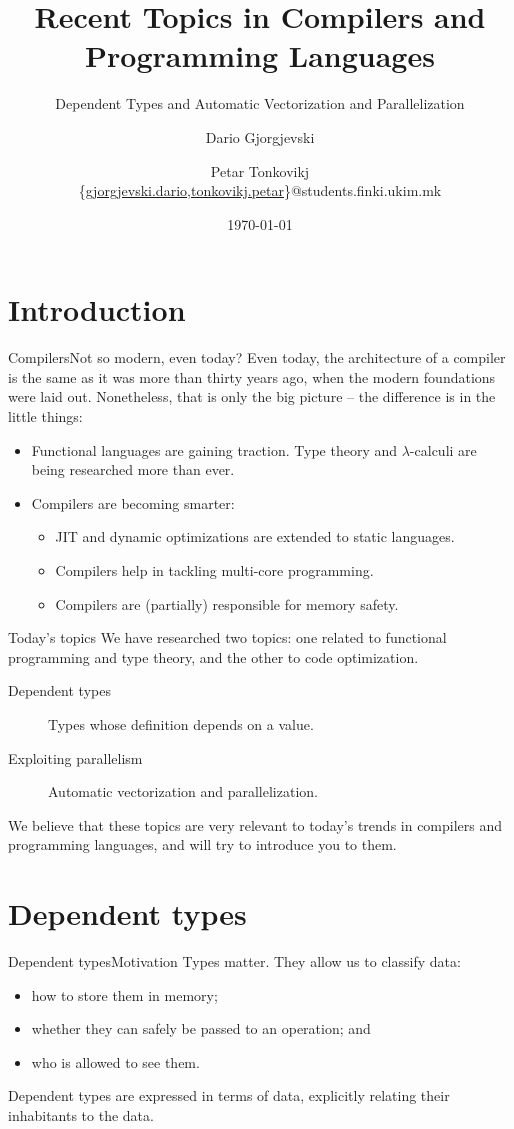 \documentclass[serif, xcolor={svgnames, table}, usepdftitle=false]{beamer}
\title[Recent Topics in Compilers]{Recent Topics in Compilers and Programming Languages}
\subtitle{Dependent Types and Automatic Vectorization and Parallelization}
\author[D.~Gj. and P.~T.]{%
  Dario Gjorgjevski\inst{1} \and Petar Tonkovikj\inst{1}\\%
  {\ttfamily\{\href{mailto:gjorgjevski.dario@students.finki.ukim.mk}{gjorgjevski.dario},\href{mailto:tonkovikj.petar@students.finki.ukim.mk}{tonkovikj.petar}\}@students.finki.ukim.mk}
}
\institute[FCSE]{%
  \inst{1}Faculty of Computer Science and Engineering\\%
  Ss.\ Cyril and Methodius University in Skopje
}
\date{\today}
\begin{document}
\begin{frame}
  \titlepage
\end{frame}

\section{Introduction}

\begin{frame}{Compilers}{Not so modern, even today?}
  Even today, the architecture of a compiler is the same as it was
  more than thirty years ago, when the modern foundations were laid
  out.  Nonetheless, that is only the big picture -- the difference is
  in the little things:
  \begin{itemize}
  \item Functional languages are gaining traction.  Type theory and
    \(\lambda\)-calculi are being researched more than ever.
  \item Compilers are becoming smarter:
    \begin{itemize}
    \item JIT and dynamic optimizations are extended to static
      languages.
    \item Compilers help in tackling multi-core programming.
    \item Compilers are (partially) responsible for memory safety.
    \end{itemize}
  \end{itemize}
\end{frame}

\begin{frame}{Today's topics}
  We have researched two topics: one related to functional programming
  and type theory, and the other to code optimization.
  \begin{description}
  \item[Dependent types] Types whose definition depends on a value.
  \item[Exploiting parallelism] Automatic vectorization and
    parallelization.
  \end{description}

  We believe that these topics are very relevant to today's trends in
  compilers and programming languages, and will try to introduce you
  to them.
\end{frame}

\section{Dependent types}
\begin{frame}{Dependent types}{Motivation}
  Types matter.  They allow us to classify data:
  \begin{itemize}
  \item how to store them in memory;
  \item whether they can safely be passed to an operation; and
  \item who is allowed to see them.
  \end{itemize}

  Dependent types are expressed in terms of data, explicitly relating
  their inhabitants to the data.
\end{frame}
\end{document}
